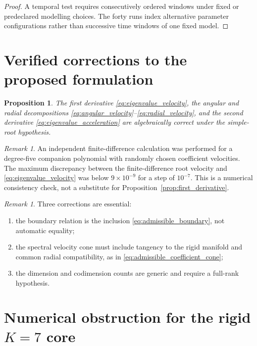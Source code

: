 \documentclass[11pt]{amsart}
\numberwithin{equation}{section}
\theoremstyle{plain}
\newtheorem{proposition}[theorem]{Proposition}
\theoremstyle{definition}
\theoremstyle{remark}
\newtheorem{remark}[theorem]{Remark}
\begin{document}
\begin{proof}
A temporal test requires consecutively ordered windows under fixed or predeclared modelling choices.  The forty runs index alternative parameter configurations rather than successive time windows of one fixed model.
\end{proof}

\section{Verified corrections to the proposed formulation}
\label{sec:verified_corrections}

\begin{proposition}
\label{prop:verified_formulae}
The first derivative \eqref{eq:eigenvalue_velocity}, the angular and radial decompositions \eqref{eq:angular_velocity}--\eqref{eq:radial_velocity}, and the second derivative \eqref{eq:eigenvalue_acceleration} are algebraically correct under the simple-root hypothesis.
\end{proposition}

\begin{remark}
\label{rem:numerical_check}
An independent finite-difference calculation was performed for a degree-five companion polynomial with randomly chosen coefficient velocities.  The maximum discrepancy between the finite-difference root velocity and \eqref{eq:eigenvalue_velocity} was below $9\times10^{-9}$ for a step of $10^{-7}$.  This is a numerical consistency check, not a substitute for Proposition~\ref{prop:first_derivative}.
\end{remark}

\begin{remark}
\label{rem:corrections}
Three corrections are essential:
\begin{enumerate}
\item the boundary relation is the inclusion \eqref{eq:admissible_boundary}, not automatic equality;
\item the spectral velocity cone must include tangency to the rigid manifold and common radial compatibility, as in \eqref{eq:admissible_coefficient_cone};
\item the dimension and codimension counts are generic and require a full-rank hypothesis.
\end{enumerate}
\end{remark}


\section{Numerical obstruction for the rigid \texorpdfstring{$K=7$}{K=7} core}
\label{sec:K7_rigid_obstruction}
\end{document}
